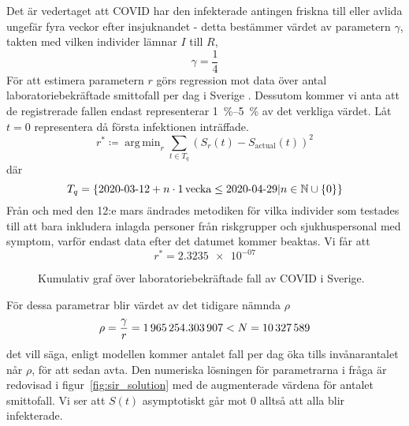 \documentclass{article}
\DeclareMathOperator*{\argmin}{arg\,min}
\newcommand\covid{COVID\nobreakdash-19}
\begin{document}
Det är vedertaget att \covid{} har den infekterade antingen
friskna till eller avlida ungefär fyra veckor efter insjuknandet -
detta bestämmer värdet av parametern $\gamma$,
takten med vilken individer lämnar $I$ till $R$,
$$ \gamma = \frac14 $$
För att estimera parametern $r$ görs regression mot data över
antal laboratoriebekräftade smittofall per dag i Sverige
\cite{folkhalso}.
Dessutom kommer vi anta att de registrerade fallen endast representerar
\SIrange{1}{5}{\percent} av det verkliga värdet.
Låt $t=0$ representera  då första infektionen inträffade.
$$ r^* \coloneqq \argmin_r \sum_{t \in T_q} (S_r(t) - S_{\text{actual}}(t))^2 $$
där
$$ T_q = \left\{\text{2020-03-12} + n \cdot 1 \text{\,vecka} \le \text{2020-04-29} \vert n \in \mathbb N \cup \{0\} \right\} $$
Från och med den 12:e mars ändrades metodiken för vilka individer
som testades till att bara inkludera inlagda personer från riskgrupper
och sjukhuspersonal med symptom,
varför endast data efter det datumet kommer beaktas.
Vi får att
$$ r^* = \num{2.3235e-07} $$


\begin{figure}
	\centering
	\caption{Kumulativ graf över laboratoriebekräftade fall av \covid{} i Sverige.
	\autocite{folkhalso} \label{fig:cum_cases}}
\end{figure}

För dessa parametrar blir värdet av det tidigare nämnda $\rho$
\def\rhoVal{1965254.303907}
$$ \rho = \frac\gamma r = \num{\rhoVal} < N = \num{\N} $$
det vill säga,
enligt modellen kommer antalet fall per dag öka tills
invånarantalet når $\rho$, för att sedan avta.
Den numeriska lösningen för parametrarna i fråga är redovisad i figur~\ref{fig:sir_solution}
med de augmenterade värdena för antalet smittofall.
Vi ser att $S(t)$ asymptotiskt går mot 0 alltså att alla blir infekterade.
\end{document}

